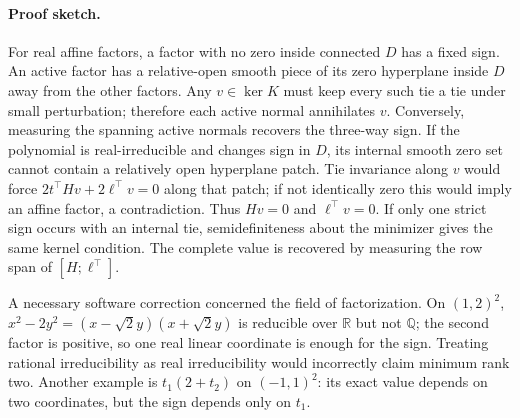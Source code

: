 \paragraph{Proof sketch.} For real affine factors, a factor with no zero inside connected $D$ has a fixed sign. An active factor has a relative-open smooth piece of its zero hyperplane inside $D$ away from the other factors. Any $v\in\ker K$ must keep every such tie a tie under small perturbation; therefore each active normal annihilates $v$. Conversely, measuring the spanning active normals recovers the three-way sign. If the polynomial is real-irreducible and changes sign in $D$, its internal smooth zero set cannot contain a relatively open hyperplane patch. Tie invariance along $v$ would force $2t^\top Hv+2\ell^\top v=0$ along that patch; if not identically zero this would imply an affine factor, a contradiction. Thus $Hv=0$ and $\ell^\top v=0$. If only one strict sign occurs with an internal tie, semidefiniteness about the minimizer gives the same kernel condition. The complete value is recovered by measuring the row span of $[H;\ell^\top]$.

A necessary software correction concerned the field of factorization. On $(1,2)^2$, $x^2-2y^2=(x-\sqrt2y)(x+\sqrt2y)$ is reducible over $\mathbb R$ but not $\mathbb Q$; the second factor is positive, so one real linear coordinate is enough for the sign. Treating rational irreducibility as real irreducibility would incorrectly claim minimum rank two. Another example is $t_1(2+t_2)$ on $(-1,1)^2$: its exact value depends on two coordinates, but the sign depends only on $t_1$.

